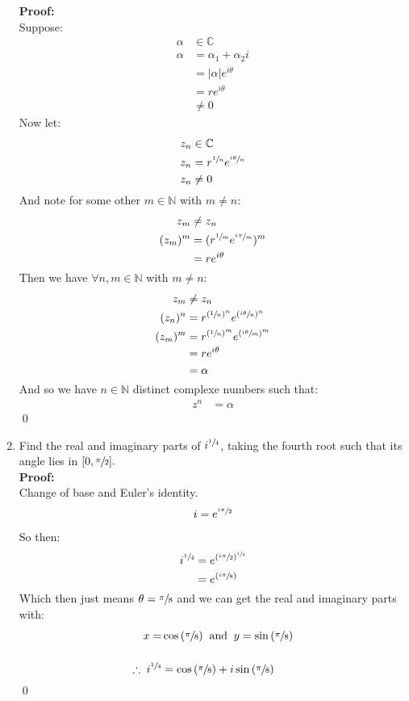 \begin{enumerate}
	\textbf{Proof:} \\
	Suppose:
	\begin{align*}
		\alpha &\in \mathbb{C} \\
		\alpha &= \alpha_1 + \alpha_2 i \\ 
		&= |\alpha|e^{i\theta} \\
		&= r e^{i\theta} \\
		&\neq 0
	\end{align*}
	Now let:
	\begin{align*}
		z_n &\in \mathbb{C} \\
		z_n &= r^{\sfrac{1}{n}}e^{\sfrac{i\theta}{n}} \\
		z_n &\neq 0
	\end{align*}
	And note for some other $m \in \mathbb{N}$ with $m \neq n:$
	\begin{align*}
		z_m &\neq z_n \\
		(z_m)^m &= (r^{\sfrac{1}{m}}e^{\sfrac{i\pi}{m}})^m \\
		&= re^{i\theta}
	\end{align*}
	Then we have $\forall n, m \in \mathbb{N}$ with $m \neq n:$
	\begin{align*}
		z_m &\neq z_n \\
		(z_n)^n &= r^{(\sfrac{1}{n})^n} e^{(\sfrac{i\theta}{n})^n} \\
		(z_m)^m &= r^{(\sfrac{1}{n})^m} e^{(\sfrac{i\theta}{m})^m} \\
		&= re^{i\theta} \\
		&= \alpha
	\end{align*}
	And so we have $n \in \mathbb{N}$ distinct complexe numbers such that:
	\begin{align*}
		z^n &= \alpha
	\end{align*}
	\qed
	
	\item Find the real and imaginary parts of $i^{\sfrac{1}{4}}$, taking the fourth root such that its angle lies in $[0, \sfrac{\pi}{2}].$ \\

	\textbf{Proof:} \\
	Change of base and Euler's identity. \\
	\begin{align*}
		i &= e^{\sfrac{i\pi}{2}} \\
	\end{align*}
	So then:
	\begin{align*}
		i^{\sfrac{1}{4}} &= e^{(\sfrac{i \pi}{2})^{\sfrac{1}{4}}} \\
		&= e^{(\sfrac{i \pi}{8})}
	\end{align*}
	Which then just means $\theta = \sfrac{\pi}{8}$ and we can get the real and imaginary parts with:
	\begin{align*}
		x = &\cos{(\sfrac{\pi}{8})} \;\; \text{and} \;\; y = \sin{(\sfrac{\pi}{8})} \\
		\\
		\therefore \; i^{\sfrac{1}{4}} &= \cos{(\sfrac{\pi}{8})} + i\sin{(\sfrac{\pi}{8})}
	\end{align*}
	\qed
	


\end{enumerate}

